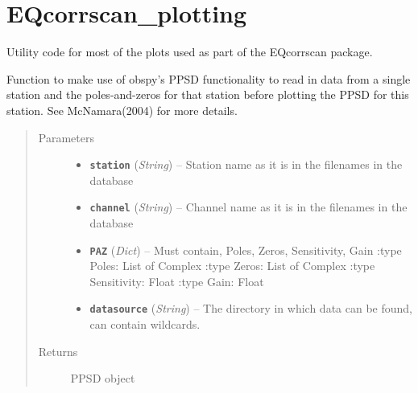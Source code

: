 \documentclass[a4paper,10pt,english]{sphinxmanual}
\begin{document}
\section{EQcorrscan\_plotting}
\label{modules:module-EQcorrscan_plotting}\label{modules:eqcorrscan-plotting}
Utility code for most of the plots used as part of the EQcorrscan package.

\begin{fulllineitems}
\label{modules:EQcorrscan_plotting.Noise_plotting}
Function to make use of obspy's PPSD functionality to read in data from
a single station and the poles-and-zeros for that station before plotting
the PPSD for this station.  See McNamara(2004) for more details.
\begin{quote}\begin{description}
\item[{Parameters}] \leavevmode\begin{itemize}
\item {} 
\textbf{\texttt{station}} (\emph{String}) -- Station name as it is in the filenames in the database

\item {} 
\textbf{\texttt{channel}} (\emph{String}) -- Channel name as it is in the filenames in the database

\item {} 
\textbf{\texttt{PAZ}} (\emph{Dict}) -- Must contain, Poles, Zeros, Sensitivity, Gain
:type Poles: List of Complex
:type Zeros: List of Complex
:type Sensitivity: Float
:type Gain: Float

\item {} 
\textbf{\texttt{datasource}} (\emph{String}) -- The directory in which data can be found, can contain
wildcards.

\end{itemize}

\item[{Returns}] \leavevmode
PPSD object

\end{description}\end{quote}

\end{fulllineitems}

\end{document}
